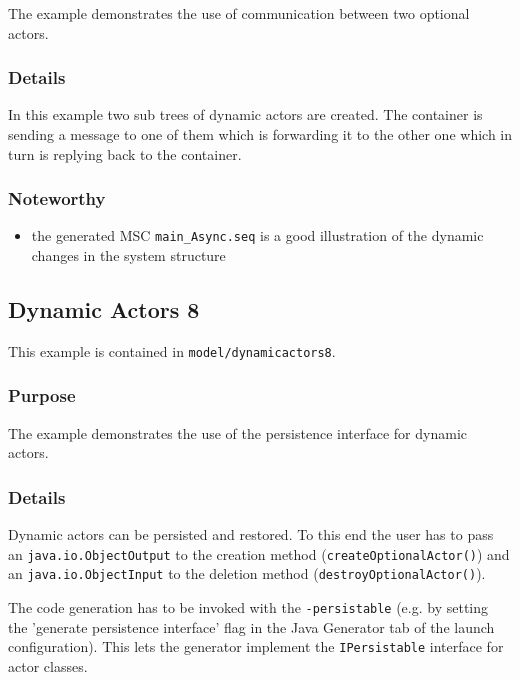 The example demonstrates the use of communication between two optional actors.

\subsubsection{Details}

In this example two sub trees of dynamic actors are created. The container is sending a message to one of them which is forwarding
it to the other one which in turn is replying back to the container.

\subsubsection{Noteworthy}

\begin{itemize}
\item the generated MSC \texttt{main\_Async.seq} is a good illustration of the dynamic changes in the system structure
\end{itemize}

\subsection{Dynamic Actors 8}

This example is contained in \texttt{model/dynamicactors8}.

\subsubsection{Purpose}

The example demonstrates the use of the persistence interface for dynamic actors.

\subsubsection{Details}

Dynamic actors can be persisted and restored. To this end the user has to pass an \texttt{java.io.ObjectOutput} to
the creation method (\texttt{createOptionalActor()}) and an \texttt{java.io.ObjectInput} to the deletion method (\texttt{destroyOptionalActor()}).

The code generation has to be invoked with the \texttt{-persistable} (e.g. by setting the 'generate persistence interface' flag in the Java Generator tab
of the launch configuration). This lets the generator implement the \texttt{IPersistable} interface for actor classes.

